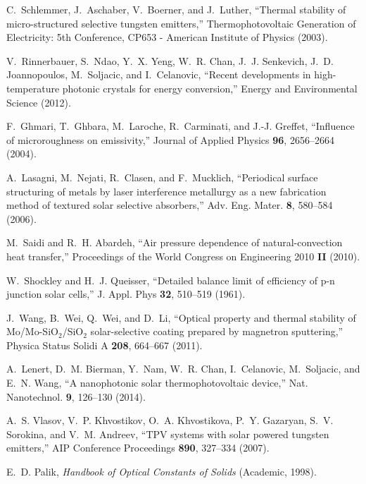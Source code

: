 \documentclass[10pt,letterpaper]{article}
\begin{document}
\begin{thebibliography}{100}
C.~Schlemmer, J.~Aschaber, V.~Boerner, and J.~Luther, \enquote{Thermal
  stability of micro-structured selective tungsten emitters,}
  Thermophotovoltaic Generation of Electricity: 5th Conference, CP653 -
  American Institute of Physics  (2003).

V.~Rinnerbauer, S.~Ndao, Y.~X. Yeng, W.~R. Chan, J.~J. Senkevich, J.~D.
  Joannopoulos, M.~Soljacic, and I.~Celanovic, \enquote{Recent developments in
  high-temperature photonic crystals for energy conversion,} Energy and
  Environmental Science  (2012).

F.~Ghmari, T.~Ghbara, M.~Laroche, R.~Carminati, and J.-J. Greffet,
  \enquote{Influence of microroughness on emissivity,} Journal of Applied
  Physics \textbf{96}, 2656--2664 (2004).

A.~Lasagni, M.~Nejati, R.~Clasen, and F.~Mucklich, \enquote{Periodical surface
  structuring of metals by laser interference metallurgy as a new fabrication
  method of textured solar selective absorbers,} Adv. Eng. Mater. \textbf{8},
  580--584 (2006).

M.~Saidi and R.~H. Abardeh, \enquote{Air pressure dependence of
  natural-convection heat transfer,} Proceedings of the World Congress on
  Engineering 2010 \textbf{II} (2010).

W.~Shockley and H.~J. Queisser, \enquote{Detailed balance limit of efficiency
  of p-n junction solar cells,} J. Appl. Phys \textbf{32}, 510--519 (1961).

J.~Wang, B.~Wei, Q.~Wei, and D.~Li, \enquote{{Optical property and thermal
  stability of {M}o/{M}o-{S}i{O}$_2$/{S}i{O}$_2$ solar-selective coating
  prepared by magnetron sputtering},} Physica Status Solidi A \textbf{208},
  664--667 (2011).

A.~Lenert, D.~M. Bierman, Y.~Nam, W.~R. Chan, I.~Celanovic, M.~Soljacic, and
  E.~N. Wang, \enquote{A nanophotonic solar thermophotovoltaic device,} Nat.
  Nanotechnol. \textbf{9}, 126--130 (2014).

A.~S. Vlasov, V.~P. Khvostikov, O.~A. Khvostikova, P.~Y. Gazaryan, S.~V.
  Sorokina, and V.~M. Andreev, \enquote{{TPV systems with solar powered
  tungsten emitters},} AIP Conference Proceedings \textbf{890}, 327--334
  (2007).

E.~D. Palik, \emph{Handbook of Optical Constants of Solids} (Academic, 1998).


\end{thebibliography}
\end{document}
